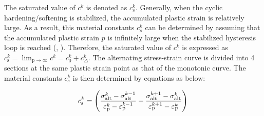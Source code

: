 \documentclass[final,5p,times,onecolumn,10pt,sort&compress]{elsarticle}
\begin{document}
The saturated value of $c^{k}$ is denoted as $c_{s}^{k}$. Generally, when the cyclic hardening/softening is stabilized, the accumulated plastic strain is relatively large. As a result, this material constants $c_{s}^{k}$ can be determined by assuming that the accumulated plastic strain $p$ is infinitely large when the stabilized hysteresis loop is reached (\citeauthor{SunCyclic}, \citeyear{SunCyclic}). Therefore, the saturated value of $c^{k}$ is expressed as $c_{\mathrm{s}}^{k}=\lim _{\mathrm{p} \rightarrow \infty} c^{k}=c_{0}^{k}+c_{\Delta}^{k}$. The alternating stress-strain curve is divided into 4 sections at the same plastic strain point as that of the monotonic curve. The material constants $c_{s}^{k}$ is then determined by equations as below:

\begin{equation}
c_{\mathrm{s}}^{k}=\left(\frac{\sigma_{\mathrm{alt}}^{k}-\sigma_{\mathrm{alt}}^{k-1}}{\varepsilon_{\mathrm{p}}^{k}-\varepsilon_{\mathrm{p}}^{k-1}} -\frac{\sigma_{\mathrm{alt}}^{k+1}-\sigma_{\mathrm{alt}}^{k}}{\varepsilon_{\mathrm{p}}^{k+1}-\varepsilon_{\mathrm{P}}^{k}}\right) \\
\end{equation}
\end{document}
